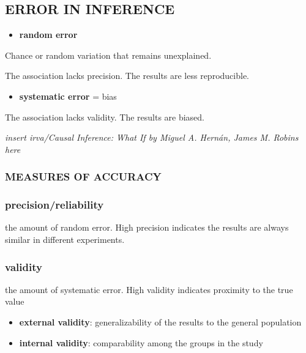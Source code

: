 \documentclass[
]{article}
\providecommand{\tightlist}{%
  \setlength{\itemsep}{0pt}\setlength{\parskip}{0pt}}
\begin{document}
\hypertarget{error-in-inference}{%
\subsection{\texorpdfstring{\textbf{ERROR IN
INFERENCE}}{ERROR IN INFERENCE}}\label{error-in-inference}}

\begin{itemize}
\tightlist
\item
  \textbf{random error}
\end{itemize}

Chance or random variation that remains unexplained.

The association lacks precision. The results are less reproducible.

\begin{itemize}
\tightlist
\item
  \textbf{systematic error} = bias
\end{itemize}

The association lacks validity. The results are biased.

\emph{insert irva/Causal Inference: What If by Miguel A. Hernán, James
M. Robins here}

\hypertarget{measures-of-accuracy}{%
\subsubsection{MEASURES OF ACCURACY}\label{measures-of-accuracy}}

\hypertarget{precisionreliability}{%
\subsubsection{precision/reliability}\label{precisionreliability}}

the amount of random error. High precision indicates the results are
always similar in different experiments.

\hypertarget{validity}{%
\subsubsection{validity}\label{validity}}

the amount of systematic error. High validity indicates proximity to the
true value

\begin{itemize}
\item
  \textbf{external validity}: generalizability of the results to the
  general population
\item
  \textbf{internal validity}: comparability among the groups in the
  study
\end{itemize}
\end{document}

